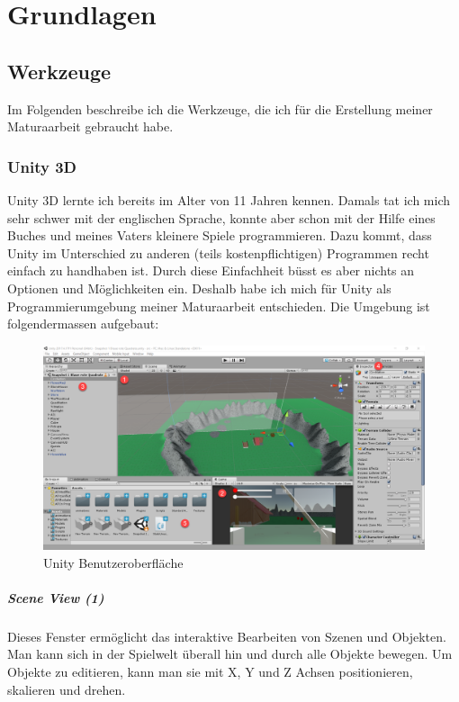 \chapter{Grundlagen}

\section{Werkzeuge}
Im Folgenden beschreibe ich die Werkzeuge, die ich für die Erstellung meiner Maturaarbeit gebraucht habe.

\subsection{Unity 3D}

Unity 3D lernte ich bereits im Alter von 11 Jahren kennen.
Damals tat ich mich sehr schwer mit der englischen Sprache, konnte aber schon mit der Hilfe eines Buches und meines Vaters kleinere Spiele programmieren.
Dazu kommt, dass Unity im Unterschied zu anderen (teils kostenpflichtigen) Programmen recht einfach zu handhaben ist. Durch diese Einfachheit büsst es aber nichts an Optionen und Möglichkeiten ein. Deshalb habe ich mich für Unity als Programmierumgebung meiner Maturaarbeit entschieden. Die Umgebung ist folgendermassen aufgebaut:

\begin{figure}[H]
\includegraphics[scale=0.4]{screenshots/unityide.png}
\caption{Unity Benutzeroberfläche}
\end{figure}

\paragraph{Scene View (1)}
Dieses Fenster ermöglicht das interaktive Bearbeiten von Szenen und Objekten.
Man kann sich in der Spielwelt überall hin und durch alle Objekte bewegen. Um Objekte zu editieren, kann man sie mit X, Y und Z Achsen positionieren, skalieren und drehen.

